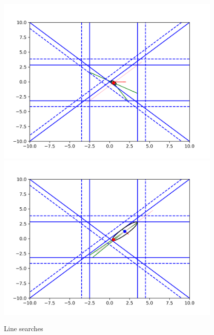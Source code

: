 \begin{figure}[h]
    \centering
    \includegraphics[scale=0.4]{images/line_1.png}
    \includegraphics[scale=0.4]{images/line_2.png}
    \caption{Line searches}
    \label{first_line_search}
\end{figure}


